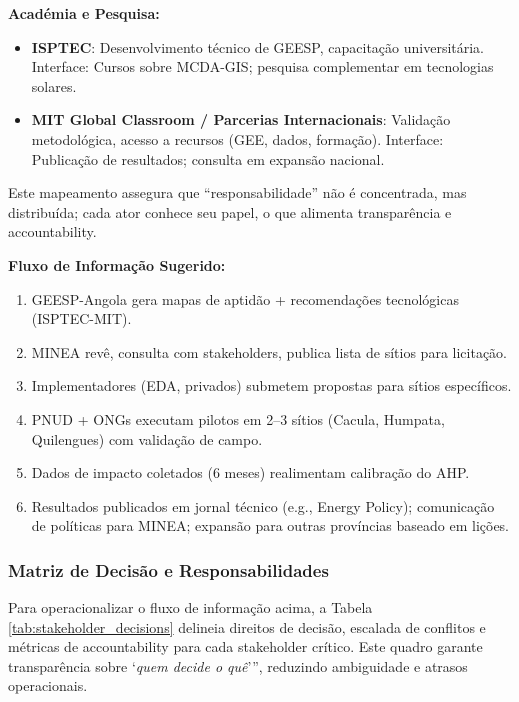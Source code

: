 \documentclass[12pt, a4paper]{article}
\begin{document}
\textbf{Académia e Pesquisa:}
\begin{itemize}
\item \textbf{ISPTEC}: Desenvolvimento técnico de GEESP, capacitação universitária. Interface: Cursos sobre MCDA-GIS; pesquisa complementar em tecnologias solares.
\item \textbf{MIT Global Classroom / Parcerias Internacionais}: Validação metodológica, acesso a recursos (GEE, dados, formação). Interface: Publicação de resultados; consulta em expansão nacional.
\end{itemize}

Este mapeamento assegura que ``responsabilidade'' não é concentrada, mas distribuída; cada ator conhece seu papel, o que alimenta transparência e accountability.

\textbf{Fluxo de Informação Sugerido:}

\begin{enumerate}
\item GEESP-Angola gera mapas de aptidão + recomendações tecnológicas (ISPTEC-MIT).
\item MINEA revê, consulta com stakeholders, publica lista de sítios para licitação.
\item Implementadores (EDA, privados) submetem propostas para sítios específicos.
\item PNUD + ONGs executam pilotos em 2--3 sítios (Cacula, Humpata, Quilengues) com validação de campo.
\item Dados de impacto coletados (6 meses) realimentam calibração do AHP.
\item Resultados publicados em jornal técnico (e.g., Energy Policy); comunicação de políticas para MINEA; expansão para outras províncias baseado em lições.
\end{enumerate}

\subsubsection{Matriz de Decisão e Responsabilidades}

Para operacionalizar o fluxo de informação acima, a Tabela \ref{tab:stakeholder_decisions} delineia direitos de decisão, escalada de conflitos e métricas de accountability para cada stakeholder crítico. Este quadro garante transparência sobre `\textit{quem decide o quê}''', reduzindo ambiguidade e atrasos operacionais.
\end{document}
